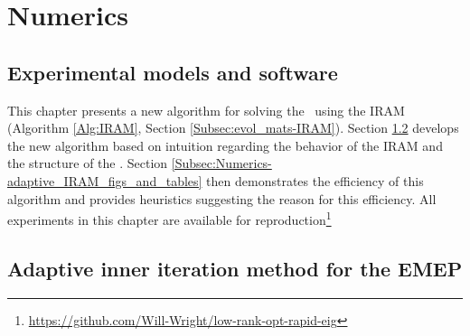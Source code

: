 \chapter{Numerics}
\label{Sec:Numerics}



\section{Experimental models and software}
\label{Subsec:Numerics-exp_models_and_software}



This chapter presents a new algorithm for solving the \emep \ using the IRAM (Algorithm \ref{Alg:IRAM}, Section \ref{Subsec:evol_mats-IRAM}).
Section \ref{Subsec:Numerics-adaptive_IRAM} develops the new algorithm based on intuition regarding the behavior of the IRAM and the structure of the \emep.
Section \ref{Subsec:Numerics-adaptive_IRAM_figs_and_tables} then demonstrates the efficiency of this algorithm and provides heuristics suggesting the reason for this efficiency.
All experiments in this chapter are available for reproduction\footnote{\url{https://github.com/Will-Wright/low-rank-opt-rapid-eig}}










\section{Adaptive inner iteration method for the EMEP}
\label{Subsec:Numerics-adaptive_IRAM}


